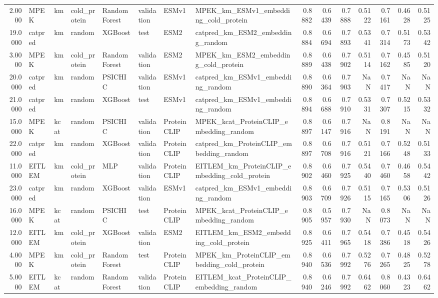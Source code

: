 \begin{tabular}{rlllllllrrrrrrr}
2.0000 & MPEK & km & cold_protein & Random Forest & validation & ESMv1 & MPEK_km_ESMv1_embedding_cold_protein & 0.8882 & 0.6439 & 0.7888 & 0.5122 & 0.7161 & 0.4628 & 0.5125 \\
19.0000 & catpred & km & random & XGBoost & test & ESM2 & catpred_km_ESM2_embedding_random & 0.8884 & 0.6694 & 0.7893 & 0.5341 & 0.7314 & 0.5173 & 0.5342 \\
3.0000 & MPEK & km & cold_protein & Random Forest & validation & ESM2 & MPEK_km_ESM2_embedding_cold_protein & 0.8889 & 0.6438 & 0.7902 & 0.5114 & 0.7162 & 0.4585 & 0.5120 \\
20.0000 & catpred & km & random & PSICHIC & validation & ESMv1 & catpred_km_ESMv1_embedding_random & 0.8890 & 0.6364 & 0.7903 & NaN & 0.7417 & NaN & NaN \\
21.0000 & catpred & km & random & XGBoost & test & ESMv1 & catpred_km_ESMv1_embedding_random & 0.8894 & 0.6688 & 0.7910 & 0.5331 & 0.7307 & 0.5215 & 0.5332 \\
15.0000 & MPEK & kcat & random & PSICHIC & validation & ProteinCLIP & MPEK_kcat_ProteinCLIP_embedding_random & 0.8897 & 0.6147 & 0.7916 & NaN & 0.8191 & NaN & NaN \\
22.0000 & catpred & km & random & XGBoost & validation & ProteinCLIP & catpred_km_ProteinCLIP_embedding_random & 0.8897 & 0.6708 & 0.7916 & 0.5121 & 0.7166 & 0.5248 & 0.5133 \\
11.0000 & EITLEM & km & cold_protein & MLP & validation & ProteinCLIP & EITLEM_km_ProteinCLIP_embedding_cold_protein & 0.8902 & 0.6460 & 0.7925 & 0.5440 & 0.7460 & 0.4658 & 0.5442 \\
23.0000 & catpred & km & random & XGBoost & validation & ESMv1 & catpred_km_ESMv1_embedding_random & 0.8903 & 0.6709 & 0.7926 & 0.5115 & 0.7165 & 0.5306 & 0.5126 \\
16.0000 & MPEK & kcat & random & PSICHIC & test & ProteinCLIP & MPEK_kcat_ProteinCLIP_embedding_random & 0.8905 & 0.5957 & 0.7930 & NaN & 0.8073 & NaN & NaN \\
12.0000 & EITLEM & km & cold_protein & XGBoost & validation & ESM2 & EITLEM_km_ESM2_embedding_cold_protein & 0.8925 & 0.6411 & 0.7965 & 0.5418 & 0.7386 & 0.4518 & 0.5426 \\
4.0000 & MPEK & km & cold_protein & Random Forest & test & ProteinCLIP & MPEK_km_ProteinCLIP_embedding_cold_protein & 0.8940 & 0.6536 & 0.7992 & 0.5276 & 0.7265 & 0.4825 & 0.5278 \\
5.0000 & EITLEM & kcat & random & Random Forest & validation & ProteinCLIP & EITLEM_kcat_ProteinCLIP_embedding_random & 0.8940 & 0.6246 & 0.7992 & 0.6462 & 0.8060 & 0.4323 & 0.6462 \\

\end{tabular}
